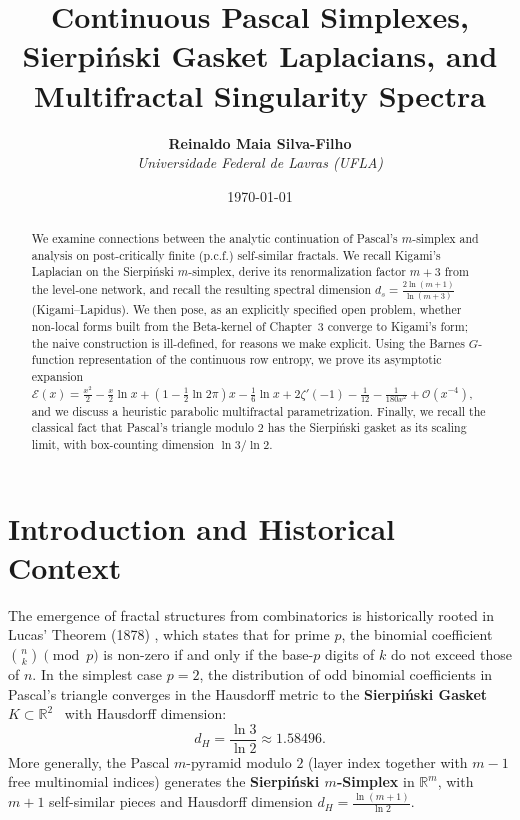 \documentclass[11pt,a4paper]{article}
\title{\textbf{Continuous Pascal Simplexes, Sierpi\'nski Gasket Laplacians, and Multifractal Singularity Spectra}}
\author{\textbf{Reinaldo Maia Silva-Filho} \\ \textit{Universidade Federal de Lavras (UFLA)}}
\date{\today}
\theoremstyle{plain}
\theoremstyle{definition}
\theoremstyle{remark}
\numberwithin{equation}{section}
\begin{document}
\maketitle

\begin{abstract}
We examine connections between the analytic continuation of Pascal's $m$-simplex and analysis on post-critically finite (p.c.f.) self-similar fractals. We recall Kigami's Laplacian on the Sierpi\'nski $m$-simplex, derive its renormalization factor $m+3$ from the level-one network, and recall the resulting spectral dimension $d_s = \frac{2\ln(m+1)}{\ln(m+3)}$ (Kigami--Lapidus). We then pose, as an explicitly specified open problem, whether non-local forms built from the Beta-kernel of Chapter~3 converge to Kigami's form; the naive construction is ill-defined, for reasons we make explicit. Using the Barnes $G$-function representation of the continuous row entropy, we prove its asymptotic expansion $\mathcal{E}(x) = \frac{x^2}{2} - \frac{x}{2}\ln x + (1 - \frac{1}{2}\ln 2\pi)x - \frac16\ln x + 2\zeta'(-1) - \frac1{12} - \frac{1}{180x^2} + \mathcal{O}(x^{-4})$, and we discuss a heuristic parabolic multifractal parametrization. Finally, we recall the classical fact that Pascal's triangle modulo $2$ has the Sierpi\'nski gasket as its scaling limit, with box-counting dimension $\ln 3/\ln 2$.
\end{abstract}

\tableofcontents
\newpage

\section{Introduction and Historical Context}

The emergence of fractal structures from combinatorics is historically rooted in Lucas' Theorem (1878) \cite{lucas1878}, which states that for prime $p$, the binomial coefficient $\binom{n}{k} \pmod p$ is non-zero if and only if the base-$p$ digits of $k$ do not exceed those of $n$. In the simplest case $p=2$, the distribution of odd binomial coefficients in Pascal's triangle converges in the Hausdorff metric to the \textbf{Sierpi\'nski Gasket} $K \subset \mathbb{R}^2$~\cite{wolfram1984} with Hausdorff dimension:
\begin{equation}
d_H = \frac{\ln 3}{\ln 2} \approx 1.58496.
\end{equation}
More generally, the Pascal $m$-pyramid modulo $2$ (layer index together with $m-1$ free multinomial indices) generates the \textbf{Sierpi\'nski $m$-Simplex} in $\mathbb{R}^{m}$, with $m+1$ self-similar pieces and Hausdorff dimension $d_H = \frac{\ln(m+1)}{\ln 2}$.
\end{document}

